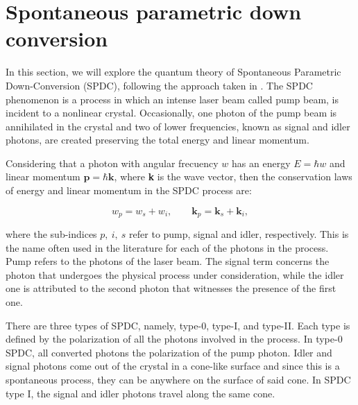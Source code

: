 \documentclass[12pt]{book}
\begin{document}
\section{Spontaneous parametric down conversion}



In this section, we will explore the quantum theory of Spontaneous Parametric Down-Conversion (SPDC), following the approach taken in \cite{procopio,multiphoton}. The SPDC phenomenon is a process in which an intense laser beam called pump beam, is incident to a nonlinear crystal. Occasionally, one photon of the pump beam is annihilated in the crystal and two of lower frequencies, known as signal and idler photons, are created preserving the total energy and linear momentum.

Considering that a photon with angular frecuency $w$ has an energy $E=\hbar w$ and linear momentum $\mathbf{p} = \hbar \mathbf{k}$, where \textbf{k} is the wave vector, then the conservation laws of energy and linear momentum in the SPDC process are: 


\begin{equation}
w_{p}=w_{s}+w_{i}, \qquad \mathbf{k}_{p}=\mathbf{k}_{s}+\mathbf{k}_{i}, \label{conservation}
\end{equation}

where the sub-indices $p,~i,~s$ refer to pump, signal and idler, respectively. This is the name often used in the literature for each of the photons in the process. Pump refers to the photons of the laser beam. The signal term concerns the photon that undergoes the physical process under consideration, while the idler one is attributed to the second photon that witnesses the presence of the first one.

There are three types of SPDC, namely, type-0, type-I, and type-II. Each type is defined by the polarization of all the photons involved in the process. In type-0 SPDC, all converted photons the polarization of the pump photon. Idler and signal photons come out of the crystal in a cone-like surface and since this is a spontaneous process, they can be anywhere on the surface of said cone. In SPDC type I, the signal and idler photons travel along the same cone.
\end{document}
